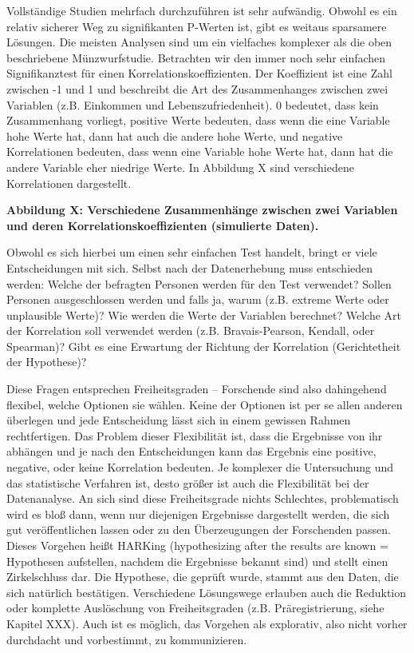 \documentclass[
  letterpaper,
  DIV=11,
  numbers=noendperiod]{scrreprt}
\begin{document}
Vollständige Studien mehrfach durchzuführen ist sehr aufwändig. Obwohl
es ein relativ sicherer Weg zu signifikanten P-Werten ist, gibt es
weitaus sparsamere Lösungen. Die meisten Analysen sind um ein vielfaches
komplexer als die oben beschriebene Münzwurfstudie. Betrachten wir den
immer noch sehr einfachen Signifikanztest für einen
Korrelationskoeffizienten. Der Koeffizient ist eine Zahl zwischen -1 und
1 und beschreibt die Art des Zusammenhanges zwischen zwei Variablen
(z.B. Einkommen und Lebenszufriedenheit). 0 bedeutet, dass kein
Zusammenhang vorliegt, positive Werte bedeuten, dass wenn die eine
Variable hohe Werte hat, dann hat auch die andere hohe Werte, und
negative Korrelationen bedeuten, dass wenn eine Variable hohe Werte hat,
dann hat die andere Variable eher niedrige Werte. In Abbildung X sind
verschiedene Korrelationen dargestellt.

\textbf{Abbildung X: Verschiedene Zusammenhänge zwischen zwei Variablen
und deren Korrelationskoeffizienten (simulierte Daten).}

Obwohl es sich hierbei um einen sehr einfachen Test handelt, bringt er
viele Entscheidungen mit sich. Selbst nach der Datenerhebung muss
entschieden werden: Welche der befragten Personen werden für den Test
verwendet? Sollen Personen ausgeschlossen werden und falls ja, warum
(z.B. extreme Werte oder unplausible Werte)? Wie werden die Werte der
Variablen berechnet? Welche Art der Korrelation soll verwendet werden
(z.B. Bravais-Pearson, Kendall, oder Spearman)? Gibt es eine Erwartung
der Richtung der Korrelation (Gerichtetheit der Hypothese)?

Diese Fragen entsprechen Freiheitsgraden -- Forschende sind also
dahingehend flexibel, welche Optionen sie wählen. Keine der Optionen ist
per se allen anderen überlegen und jede Entscheidung lässt sich in einem
gewissen Rahmen rechtfertigen. Das Problem dieser Flexibilität ist, dass
die Ergebnisse von ihr abhängen und je nach den Entscheidungen kann das
Ergebnis eine positive, negative, oder keine Korrelation bedeuten. Je
komplexer die Untersuchung und das statistische Verfahren ist, desto
größer ist auch die Flexibilität bei der Datenanalyse. An sich sind
diese Freiheitsgrade nichts Schlechtes, problematisch wird es bloß dann,
wenn nur diejenigen Ergebnisse dargestellt werden, die sich gut
veröffentlichen lassen oder zu den Überzeugungen der Forschenden passen.
Dieses Vorgehen heißt HARKing (hypothesizing after the results are known
= Hypothesen aufstellen, nachdem die Ergebnisse bekannt sind) und stellt
einen Zirkelschluss dar. Die Hypothese, die geprüft wurde, stammt aus
den Daten, die sich natürlich bestätigen. Verschiedene Lösungswege
erlauben auch die Reduktion oder komplette Auslöschung von
Freiheitsgraden (z.B. Präregistrierung, siehe Kapitel XXX). Auch ist es
möglich, das Vorgehen als explorativ, also nicht vorher durchdacht und
vorbestimmt, zu kommunizieren.
\end{document}
